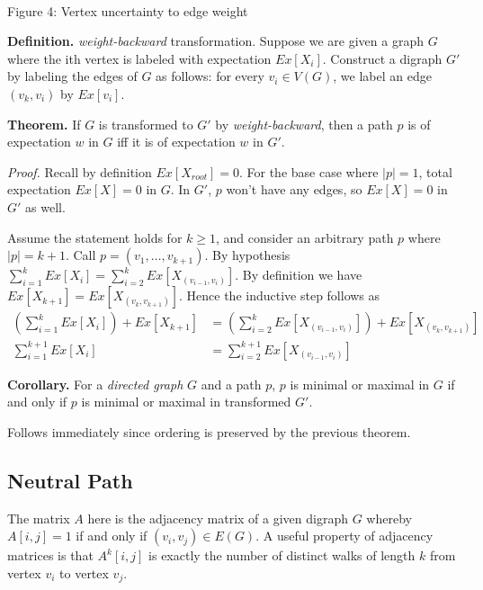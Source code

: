 \begin{center}
     \\
    Figure 4: Vertex uncertainty to edge weight
\end{center}


\textbf{Definition.} \textit{weight-backward} transformation. Suppose we are given a graph $G$ where the ith vertex is labeled with expectation $Ex[X_i]$. Construct a digraph $G'$ by labeling the edges of $G$ as follows: for every $v_i \in V(G)$, we label an edge $(v_k, v_i)$ by $Ex[v_i]$.

\textbf{Theorem.} If $G$ is transformed to $G'$ by \textit{weight-backward}, then a path $p$ is of expectation $w$ in $G$ iff it is of expectation $w$ in $G'$.

\textit{Proof.} Recall by definition $Ex[X_{root}] = 0$. For the base case where $|p| = 1$, total expectation $Ex[X] = 0$ in $G$. In $G'$, $p$ won't have any edges, so $Ex[X] = 0$ in $G'$ as well.

Assume the statement holds for $k \geq 1$, and consider an arbitrary path $p$ where $|p| = k+1$. Call $p = (v_1, \dots, v_{k+1})$. By hypothesis $\sum_{i=1}^k Ex[X_i] = \sum_{i=2}^k Ex[X_{(v_{i-1}, v_{i})}]$. By definition we have $Ex[X_{k+1}] = Ex[X_{(v_k, v_{k+1})}]$. Hence the inductive step follows as
\begin{align*}
\left ( \sum_{i=1}^k Ex[X_i] \right ) + Ex[X_{k+1}] &= \left ( \sum_{i=2}^k Ex[X_{(v_{i-1}, v_{i})}] \right ) + Ex[X_{(v_k, v_{k+1})}] \\
\sum_{i=1}^{k+1} Ex[X_i] &= \sum_{i=2}^{k+1} Ex[X_{(v_{i-1}, v_{i})}]
\end{align*}

\textbf{Corollary.} For a \textit{directed graph} $G$ and a path $p$, $p$ is minimal or maximal in $G$ if and only if $p$ is minimal or maximal in transformed $G'$.

Follows immediately since ordering is preserved by the previous theorem.

\subsection{Neutral Path} \label{Neutral Path}

The matrix $A$ here is the adjacency matrix of a given digraph $G$ whereby $A[i,j] = 1$ if and only if $(v_i, v_j) \in E(G)$. A useful property of adjacency matrices is that $A^k[i,j]$ is exactly the number of distinct walks of length $k$ from vertex $v_i$ to vertex $v_j$. 

